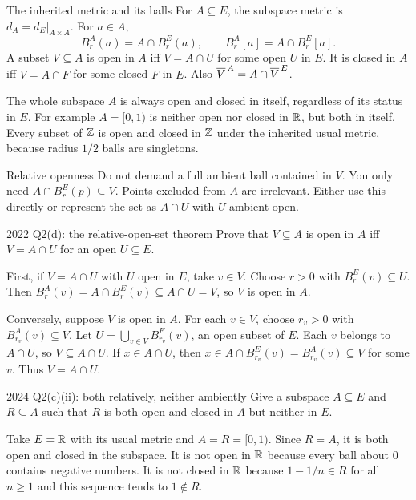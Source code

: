 \begin{note}{The inherited metric and its balls}
For $A\subseteq E$, the subspace metric is $d_A=d_E|_{A\times A}$. For $a\in A$,
\[B_r^A(a)=A\cap B_r^E(a),\qquad B_r^A[a]=A\cap B_r^E[a].\]
A subset $V\subseteq A$ is open in $A$ iff $V=A\cap U$ for some open $U$ in $E$. It is closed in $A$ iff $V=A\cap F$ for some closed $F$ in $E$. Also $\overline{V}^{\,A}=A\cap\overline{V}^{\,E}$.

The whole subspace $A$ is always open and closed in itself, regardless of its status in $E$. For example $A=[0,1)$ is neither open nor closed in $\mathbb R$, but both in itself. Every subset of $\mathbb Z$ is open and closed in $\mathbb Z$ under the inherited usual metric, because radius $1/2$ balls are singletons.
\end{note}
\begin{method}{Relative openness}
Do not demand a full ambient ball contained in $V$. You only need $A\cap B_r^E(p)\subseteq V$. Points excluded from $A$ are irrelevant. Either use this directly or represent the set as $A\cap U$ with $U$ ambient open.
\end{method}
\begin{exam}{2022 Q2(d): the relative-open-set theorem}
Prove that $V\subseteq A$ is open in $A$ iff $V=A\cap U$ for an open $U\subseteq E$.
\end{exam}
\begin{answer}
First, if $V=A\cap U$ with $U$ open in $E$, take $v\in V$. Choose $r>0$ with $B_r^E(v)\subseteq U$. Then $B_r^A(v)=A\cap B_r^E(v)\subseteq A\cap U=V$, so $V$ is open in $A$.

Conversely, suppose $V$ is open in $A$. For each $v\in V$, choose $r_v>0$ with $B_{r_v}^A(v)\subseteq V$. Let $U=\bigcup_{v\in V}B_{r_v}^E(v)$, an open subset of $E$. Each $v$ belongs to $A\cap U$, so $V\subseteq A\cap U$. If $x\in A\cap U$, then $x\in A\cap B_{r_v}^E(v)=B_{r_v}^A(v)\subseteq V$ for some $v$. Thus $V=A\cap U$.
\end{answer}
\begin{exam}{2024 Q2(c)(ii): both relatively, neither ambiently}
Give a subspace $A\subseteq E$ and $R\subseteq A$ such that $R$ is both open and closed in $A$ but neither in $E$.
\end{exam}
\begin{answer}
Take $E=\mathbb R$ with its usual metric and $A=R=[0,1)$. Since $R=A$, it is both open and closed in the subspace. It is not open in $\mathbb R$ because every ball about $0$ contains negative numbers. It is not closed in $\mathbb R$ because $1-1/n\in R$ for all $n\ge1$ and this sequence tends to $1\notin R$.
\end{answer}


